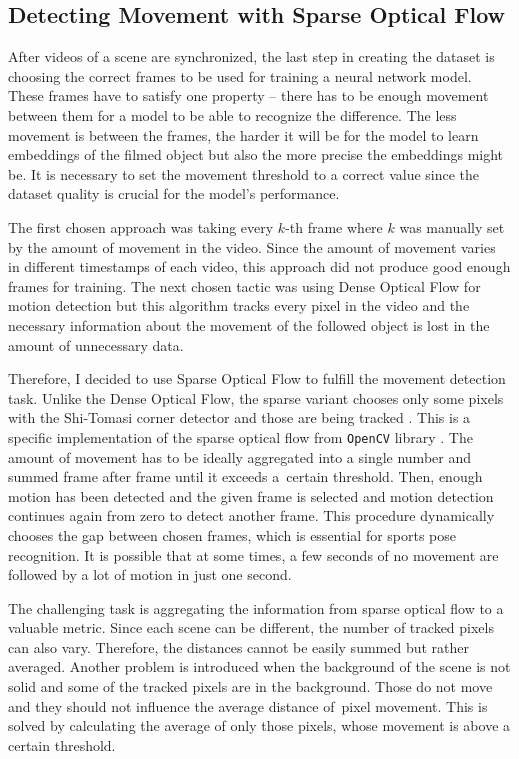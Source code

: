 \subsection{\label{sec:motion-detect}Detecting Movement with Sparse Optical Flow}

After videos of a scene are synchronized, the last step in creating the dataset is choosing the correct frames to be used for training a neural network model. These frames have to satisfy one property -- there has to be enough movement between them for a model to be able to recognize the difference. The less movement is between the frames, the harder it will be for the model to learn embeddings of the filmed object but also the more precise the embeddings might be. It is necessary to set the movement threshold to a correct value since the dataset quality is crucial for the model's performance.

The first chosen approach was taking every $k$-th frame where $k$ was manually set by the amount of movement in the video. Since the amount of movement varies in different timestamps of each video, this approach did not produce good enough frames for training. The next chosen tactic was using Dense Optical Flow for motion detection but this algorithm tracks every pixel in the video and the necessary information about the movement of the followed object is lost in the amount of unnecessary data.

Therefore, I decided to use Sparse Optical Flow to fulfill the movement detection task. Unlike the Dense Optical Flow, the sparse variant chooses only some pixels with the Shi-Tomasi corner detector and those are being tracked \cite{shi-tomasi-323794}. This is a specific implementation of the sparse optical flow from \texttt{OpenCV} library \cite{LearningOpenCV}. The amount of movement has to be ideally aggregated into a single number and summed frame after frame until it exceeds a~certain threshold. Then, enough motion has been detected and the given frame is selected and motion detection continues again from zero to detect another frame. This procedure dynamically chooses the gap between chosen frames, which is essential for sports pose recognition. It is possible that at some times, a few seconds of no movement are followed by a lot of motion in just one second.

The challenging task is aggregating the information from sparse optical flow to a valuable metric. Since each scene can be different, the number of tracked pixels can also vary. Therefore, the distances cannot be easily summed but rather averaged. Another problem is introduced when the background of the scene is not solid and some of the tracked pixels are in the background. Those do not move and they should not influence the average distance of~pixel movement. This is solved by calculating the average of only those pixels, whose movement is above a certain threshold.

